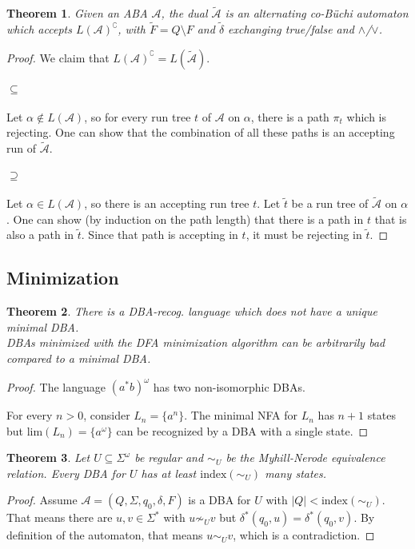 \documentclass{article}
\newtheorem{theorem}{Theorem}[section]
\begin{document}
\vspace{.5cm}
\begin{theorem}
	Given an ABA $\mathcal{A}$, the dual $\tilde{\mathcal{A}}$ is an alternating co-Büchi automaton which accepts $L(\mathcal{A})^\complement$, with $\tilde{F} = Q \setminus F$ and $\tilde{\delta}$ exchanging true/false and $\land$/$\lor$.
\end{theorem}
\begin{proof}
	We claim that $L(\mathcal{A})^\complement = L(\tilde{\mathcal{A}})$.
	
	\paragraph{$\bm{\subseteq}$} Let $\alpha \notin L(\mathcal{A})$, so for every run tree $t$ of $\mathcal{A}$ on $\alpha$, there is a path $\pi_t$ which is rejecting. One can show that the combination of all these paths is an accepting run of $\tilde{\mathcal{A}}$.
	
	\paragraph{$\bm{\supseteq}$} Let $\alpha \in L(\mathcal{A})$, so there is an accepting run tree $t$. Let $\tilde{t}$ be a run tree of $\tilde{\mathcal{A}}$ on $\alpha$. One can show (by induction on the path length) that there is a path in $t$ that is also a path in $\tilde{t}$. Since that path is accepting in $t$, it must be rejecting in $\tilde{t}$.
\end{proof}


\subsection{Minimization}
\begin{theorem}
	There is a DBA-recog. language which does not have a unique minimal DBA. \\
	DBAs minimized with the DFA minimization algorithm can be arbitrarily bad compared to a minimal DBA.
\end{theorem}
\begin{proof}
	The language $(a^* b)^\omega$ has two non-isomorphic DBAs.
	
	For every $n>0$, consider $L_n = \{a^n\}$. The minimal NFA for $L_n$ has $n+1$ states but $\text{lim}(L_n) = \{a^\omega\}$ can be recognized by a DBA with a single state.
\end{proof}


\vspace{.5cm}
\begin{theorem}
	Let $U \subseteq \Sigma^\omega$ be regular and $\sim_U$ be the Myhill-Nerode equivalence relation. Every DBA for $U$ has at least $\text{index}(\sim_U)$ many states.
\end{theorem}
\begin{proof}
	Assume $\mathcal{A} = (Q, \Sigma, q_0, \delta, F)$ is a DBA for $U$ with $|Q| < \text{index}(\sim_U)$. That means there are $u, v \in \Sigma^*$ with $u \not\sim_U v$ but $\delta^*(q_0, u) = \delta^*(q_0, v)$. By definition of the automaton, that means $u \sim_U v$, which is a contradiction.
\end{proof}
\end{document}
